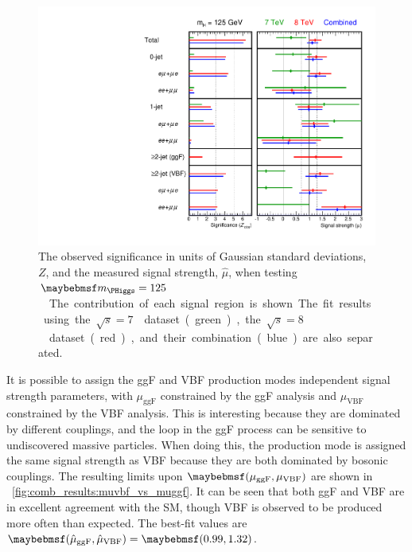 \begin{figure}[p]
	\includegraphics[width=\hugefigwidth]{custom_images/limits/z_and_mu}
	\caption{The observed significance in units of Gaussian standard deviations, $Z$, and 
	the measured signal strength, $\hat{\mu}$, when testing \unit{$\mH = 125$}{\GeV}. The 
	contribution of each signal region is shown. The fit results using the 
	\unit{$\sqrt{s} = 7$}{\TeV} dataset (green), the \unit{$\sqrt{s} = 8$}{\TeV} dataset 
	(red), and their combination (blue) are also separated.}
	\label{fig:comb_results:p0_mu_breakdown}
\end{figure}

It is possible to assign the ggF and VBF production modes independent signal strength 
parameters, with $\mu_{\text{ggF}}$ constrained by the ggF analysis and 
$\mu_{\text{VBF}}$ constrained by the VBF analysis. This is interesting because they 
are dominated by different couplings, and the loop in the ggF process can be 
sensitive to undiscovered massive particles. When doing this, the \VH production mode is 
assigned the same signal strength as VBF because they are both dominated by bosonic 
couplings. The resulting limits upon $\parenths{\mu_{\text{ggF}}, \mu_{\text{VBF}}}$ are 
shown in \Figure~\ref{fig:comb_results:muvbf_vs_muggf}. It can be seen that both ggF and VBF 
are in excellent agreement with the SM, though VBF is observed to be produced more often 
than expected. The best-fit values are $\parenths{\hat{\mu}_{\text{ggF}}, \hat{\mu}_{\text{VBF}}} = \parenths{0.99, 1.32}$.

